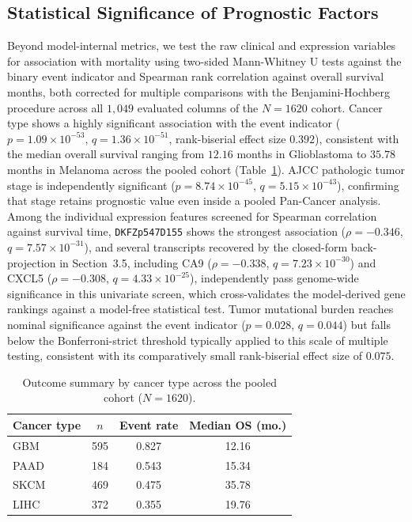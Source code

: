\documentclass[sigconf, review=true]{acmart}
\begin{document}
\subsection{Statistical Significance of Prognostic Factors}
Beyond model-internal metrics, we test the raw clinical and expression variables for association with mortality using two-sided Mann-Whitney U tests against the binary event indicator and Spearman rank correlation against overall survival months, both corrected for multiple comparisons with the Benjamini-Hochberg procedure across all $1{,}049$ evaluated columns of the $N = 1620$ cohort. Cancer type shows a highly significant association with the event indicator ($p = 1.09 \times 10^{-53}$, $q = 1.36 \times 10^{-51}$, rank-biserial effect size $0.392$), consistent with the median overall survival ranging from $12.16$ months in Glioblastoma to $35.78$ months in Melanoma across the pooled cohort (Table~\ref{tab:cancer_outcomes}). AJCC pathologic tumor stage is independently significant ($p = 8.74 \times 10^{-45}$, $q = 5.15 \times 10^{-43}$), confirming that stage retains prognostic value even inside a pooled Pan-Cancer analysis. Among the individual expression features screened for Spearman correlation against survival time, \texttt{DKFZp547D155} shows the strongest association ($\rho = -0.346$, $q = 7.57 \times 10^{-31}$), and several transcripts recovered by the closed-form back-projection in Section~3.5, including CA9 ($\rho = -0.338$, $q = 7.23 \times 10^{-30}$) and CXCL5 ($\rho = -0.308$, $q = 4.33 \times 10^{-25}$), independently pass genome-wide significance in this univariate screen, which cross-validates the model-derived gene rankings against a model-free statistical test. Tumor mutational burden reaches nominal significance against the event indicator ($p = 0.028$, $q = 0.044$) but falls below the Bonferroni-strict threshold typically applied to this scale of multiple testing, consistent with its comparatively small rank-biserial effect size of $0.075$.

\begin{table}[t]
  \caption{Outcome summary by cancer type across the pooled cohort ($N=1620$).}
  \label{tab:cancer_outcomes}
  \begin{tabular}{lccc}
    \toprule
    Cancer type & $n$ & Event rate & Median OS (mo.) \\
    \midrule
    GBM  & 595 & 0.827 & 12.16 \\
    PAAD & 184 & 0.543 & 15.34 \\
    SKCM & 469 & 0.475 & 35.78 \\
    LIHC & 372 & 0.355 & 19.76 \\
  \bottomrule
\end{tabular}
\end{table}
\end{document}

